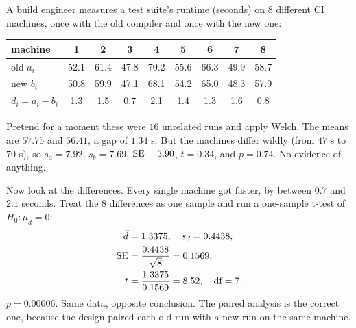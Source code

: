 A build engineer measures a test suite's runtime (seconds) on $8$ different CI
machines, once with the old compiler and once with the new one:
\begin{center}
\small
\begin{tabular}{lcccccccc}
\toprule
machine & 1 & 2 & 3 & 4 & 5 & 6 & 7 & 8\\
\midrule
old $a_i$ & 52.1 & 61.4 & 47.8 & 70.2 & 55.6 & 66.3 & 49.9 & 58.7\\
new $b_i$ & 50.8 & 59.9 & 47.1 & 68.1 & 54.2 & 65.0 & 48.3 & 57.9\\
$d_i=a_i-b_i$ & 1.3 & 1.5 & 0.7 & 2.1 & 1.4 & 1.3 & 1.6 & 0.8\\
\bottomrule
\end{tabular}
\end{center}

Pretend for a moment these were $16$ unrelated runs and apply Welch. The means are
$57.75$ and $56.41$, a gap of $1.34$ s. But the machines differ wildly (from $47$ s
to $70$ s), so $s_a = 7.92$, $s_b = 7.69$, $\operatorname{SE} = 3.90$, $t = 0.34$, and $p=0.74$.
No evidence of anything.

Now look at the differences. Every single machine got faster, by between $0.7$ and
$2.1$ seconds. Treat the $8$ differences as one sample and run a one-sample t-test of
$H_0\colon \mu_d = 0$:
\begin{align*}
  \bar d &= 1.3375, \quad s_d = 0.4438, \\
  \operatorname{SE} &= \frac{0.4438}{\sqrt 8} = 0.1569, \\
  t &= \frac{1.3375}{0.1569} = 8.52, \quad \text{df}=7 .
\end{align*}
$p = 0.00006$. Same data, opposite conclusion. The paired analysis is the correct
one, because the design paired each old run with a new run on the same machine.


